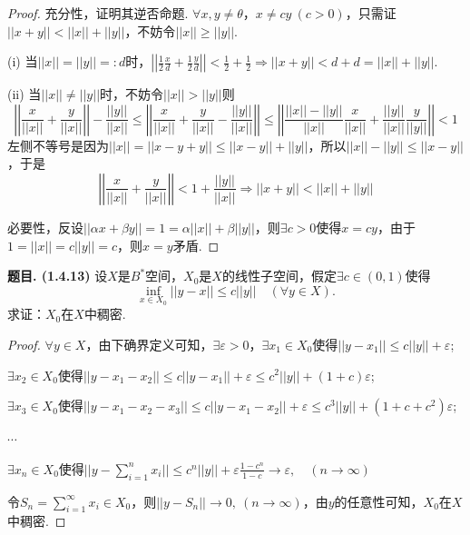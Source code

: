 \documentclass[12pt, a4paper, oneside]{ctexart}
\newcounter{problem}  %
\newenvironment{problem}[1][]{\stepcounter{problem}\par\noindent\textbf{题目\arabic{problem}. #1}}{\smallskip\par}
\let\leq=\leqslant %
\let\geq=\geqslant %
\def\add{\vspace{1ex}}      %
\begin{document}
\begin{proof}
    充分性，证明其逆否命题. $\forall x, y\neq \theta$，$x\neq cy\ (c > 0)$，只需证$||x+y|| < ||x||+||y||$，不妨令$||x||\geq ||y||$.

    (i) 当$||x|| = ||y||=:d$时，$\left|\left|\frac{1}{2}\frac{x}{d}+\frac{1}{2}\frac{y}{d}\right|\right| < \frac{1}{2}+\frac{1}{2}\Rightarrow ||x+y|| < d+d = ||x||+||y||$.\add

    (ii) 当$||x||\neq ||y||$时，不妨令$||x|| > ||y||$则
    \begin{equation*}
        \left|\left|\frac{x}{||x||}+\frac{y}{||x||}\right|\right|-\frac{||y||}{||x||}\leq \left|\left|\frac{x}{||x||}+\frac{y}{||x||}-\frac{||y||}{||x||}\right|\right|\leq \left|\left|\frac{||x||-||y||}{||x||}\frac{x}{||x||}+\frac{||y||}{||x||}\frac{y}{||y||}\right|\right|<1
    \end{equation*}
    左侧不等号是因为$||x||= ||x-y+y||\leq ||x-y||+||y||$，所以$||x||-||y||\leq ||x-y||$，于是
    \begin{equation*}
        \left|\left|\frac{x}{||x||}+\frac{y}{||x||}\right|\right| < 1+\frac{||y||}{||x||}\Rightarrow ||x+y|| < ||x||+||y||
    \end{equation*}

    必要性，反设$||\alpha x+\beta y|| = 1 = \alpha||x||+\beta||y||$，则$\exists c > 0$使得$x=cy$，由于$1=||x||=c||y|| = c$，则$x=y$矛盾.
\end{proof}
\begin{problem}[(1.4.13)]
    设$X$是$B^*$空间，$X_0$是$X$的线性子空间，假定$\exists c\in (0,1)$使得
    \begin{equation*}
        \inf_{x\in X_0}||y-x||\leq c||y||\quad(\forall y\in X).
    \end{equation*}
    求证：$X_0$在$X$中稠密.
\end{problem}
\begin{proof}
    $\forall y\in X$，由下确界定义可知，$\exists \varepsilon > 0$，$\exists x_1\in X_0$使得$||y-x_1||\leq c||y||+\varepsilon$;

    $\exists x_2\in X_0$使得$||y-x_1-x_2||\leq c||y-x_1||+\varepsilon\leq c^2||y||+(1+c)\varepsilon$;

    $\exists x_3\in X_0$使得$||y-x_1-x_2-x_3||\leq c||y-x_1-x_2||+\varepsilon\leq c^3||y||+(1+c+c^2)\varepsilon$;
    
    $\cdots$

    $\exists x_n\in X_0$使得$||y-\sum_{i=1}^nx_i||\leq c^n||y||+\varepsilon\frac{1-c^n}{1-c}\to\varepsilon,\quad (n\to \infty)$

    令$S_n=\sum_{i=1}^\infty x_i\in X_0$，则$||y-S_n||\to 0,\ (n\to \infty)$，由$y$的任意性可知，$X_0$在$X$中稠密.
\end{proof}
\end{document}

